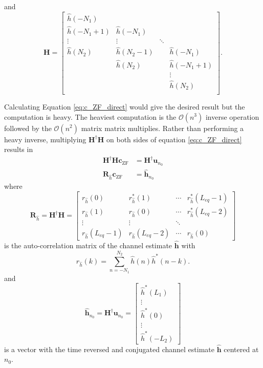 and
\begin{equation} 
\mathbf{H} = 
		\begin{bmatrix}
		\hat{h}(-N_1)		&  				& 		 	&  					\\
		\hat{h}(-N_1+1) 	& \hat{h}(-N_1)	& 		 	&  					\\
		\vdots	 			& \vdots		& \ddots 	&  					\\
		\hat{h}(N_2)		& \hat{h}(N_2-1)&  			& \hat{h}(-N_1)  	\\
		 					& \hat{h}(N_2) 	&  			& \hat{h}(-N_1+1) 	\\
		 					&  	   			&  			& \vdots			\\
		 					&  	   			&  			& \hat{h}(N_2)		\\
	\end{bmatrix}.
\end{equation}

Calculating Equation \eqref{eq:c_ZF_direct} would give the desired result but the computation is heavy.
The heaviest computation is the $\mathcal{O}(n^3)$ inverse operation followed by the $\mathcal{O}(n^2)$ matrix matrix multiplies.
Rather than performing a heavy inverse, multiplying $\mathbf{H}^\dagger \mathbf{H}$ on both sides of equation \eqref{eq:c_ZF_direct} results in
\begin{align}
\mathbf{H}^\dagger\mathbf{H} \mathbf{c}_\text{ZF} &= \mathbf{H}^\dagger \mathbf{u}_{n_0} \nonumber \\
\mathbf{R}_{\hat{h}} \mathbf{c}_\text{ZF} &= \hat{\mathbf{h}}_{n_0}
\label{eq:c_ZF_solve}
\end{align}
where
\begin{equation}
\mathbf{R}_{\hat{h}} = 
\mathbf{H}^\dagger \mathbf{H} = 
		\begin{bmatrix}
		r_{\hat{h}}(0)			& r^\ast_{\hat{h}}(1)	& \cdots 	& r^\ast_{\hat{h}}(L_{eq}-1)  	\\
		r_{\hat{h}}(1) 			& r_{\hat{h}}(0)		& \cdots 	& r^\ast_{\hat{h}}(L_{eq}-2)  	\\
		\vdots	 				& \vdots				& \ddots 	&  								\\
		r_{\hat{h}}(L_{eq}-1)	& r_{\hat{h}}(L_{eq}-2)	& \cdots	& r_{\hat{h}}(0)  			
	\end{bmatrix}
	\label{eq:R_h}
\end{equation}
is the auto-correlation matrix of the channel estimate $\hat{\mathbf{h}}$ with 
\begin{equation}
r_{\hat{h}}(k) = \sum_{n=-N_1}^{N_2} \hat{h}(n) \hat{h}^\ast(n-k).
\end{equation}
and 
\begin{equation}
\hat{\mathbf{h}}_{n_0} = \mathbf{H}^\dagger \mathbf{u}_{n_0} = 
\begin{bmatrix} \hat{h}^\ast(L_1) \\ \vdots \\ \hat{h}^\ast(0) \\ \vdots \\ \hat{h}^\ast(-L_2)  \end{bmatrix}
\label{eq:h_no}
\end{equation}
is a vector with the time reversed and conjugated channel estimate $\hat{\mathbf{h}}$ centered at $n_0$.

